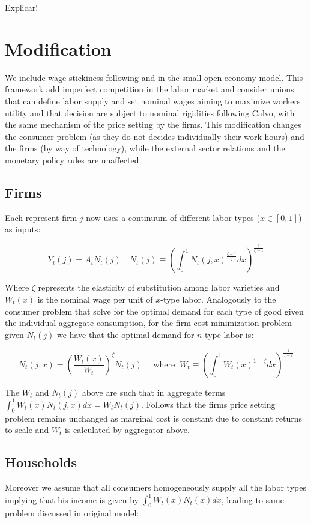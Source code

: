 \documentclass{article}
\begin{document}
Explicar!

\section{Modification}
We include wage stickiness following \cite{erceg} and \citet[Chap.~6]{gali2015} in the small open economy model. This framework add imperfect competition in the labor market and consider unions that can define labor supply and set nominal wages aiming to maximize workers utility and that decision are subject to nominal rigidities following Calvo, with the same mechanism of the price setting by the firms. This modification changes the consumer problem (as they do not decides individually their work hours) and the firms (by way of technology), while the external sector relations and the monetary policy rules are unaffected.

\subsection{Firms}
Each represent firm $j$ now uses a continuum of different labor types ($x \in [0,1]$) as inputs:

\begin{equation}
    Y_t(j) = A_t N_t(j) \quad N_t(j) \equiv \left( \int^1_0 N_t(j, x)^{\frac{\zeta-1}{\zeta}} dx \right)^{\frac{\zeta}{\zeta-1}}
\end{equation}

Where $\zeta$ represents the elasticity of substitution among labor varieties and $W_t(x)$ is the nominal wage per unit of $x$-type labor. Analogously to the consumer problem that solve for the optimal demand for each type of good given the individual aggregate consumption, for the firm cost minimization problem given $N_t(j)$ we have that the optimal demand for $n$-type labor is:

\begin{equation}
    N_t(j,x) = \left(\frac{W_t(x)}{W_t} \right)^\zeta N_t(j) \quad \textrm{ where } \ W_t \equiv \left(\int^1_0 W_t(x)^{1-\zeta} dx \right)^{\frac{1}{1-\zeta}}
\end{equation}

The $W_t$ and $N_t(j)$ above are such that in aggregate terms $\int^1_0 W_t(x) N_t(j,x) dx = W_t N_t(j)$. Follows that the firms price setting problem remains unchanged as marginal cost is constant due to constant returns to scale and $W_t$ is calculated by aggregator above.

\subsection{Households}
Moreover we assume that all consumers homogeneously supply all the labor types implying that his income is given by $\int^1_0 W_t(x) N_t(x) dx$, leading to same problem discussed in original model:
\end{document}
